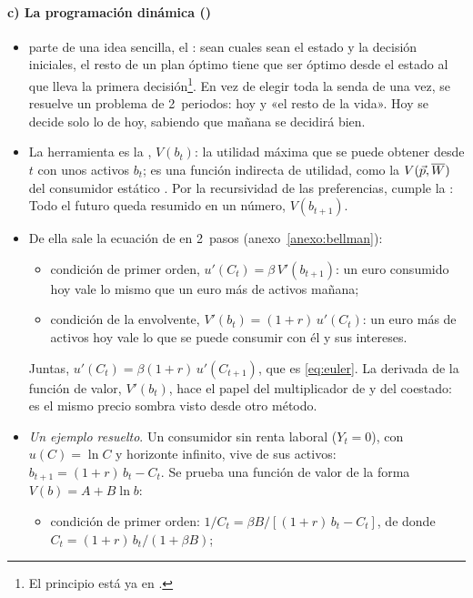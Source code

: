 \documentclass[11pt]{article}
\begin{document}
\paragraph{c) La programación dinámica ()}

\begin{itemize}
\item \textcite{Bellman1957Dynamic} parte de una idea sencilla, el : sean cuales sean el estado y la decisión iniciales, el resto de un plan óptimo tiene que ser óptimo desde el estado al que lleva la primera decisión\footnote{El principio está ya en \textcite{Bellman1952Theory}.}. En vez de elegir toda la senda de una vez, se resuelve un problema de 2~periodos: hoy y «el resto de la vida». Hoy se decide solo lo de hoy, sabiendo que mañana se decidirá bien.
\item La herramienta es la , $V(b_t)$: la utilidad máxima que se puede obtener desde $t$ con unos activos $b_t$; es una función indirecta de utilidad, como la $V(\vec{p},\overline W)$ del consumidor estático . Por la recursividad de las preferencias, cumple la :
  Todo el futuro queda resumido en un número, $V(b_{t+1})$.
\item De ella sale la ecuación de  en 2~pasos (anexo~\ref{anexo:bellman}):
  \begin{itemize}
  \item condición de primer orden, $u'(C_t)=\beta\,V'(b_{t+1})$: un euro consumido hoy vale lo mismo que un euro más de activos mañana;
  \item condición de la envolvente, $V'(b_t)=(1+r)\,u'(C_t)$: un euro más de activos hoy vale lo que se puede consumir con él y sus intereses.
  \end{itemize}
  Juntas, $u'(C_t)=\beta(1+r)\,u'(C_{t+1})$, que es \eqref{eq:euler}. La derivada de la función de valor, $V'(b_t)$, hace el papel del multiplicador de  y del coestado: es el mismo precio sombra visto desde otro método.
\item \emph{Un ejemplo resuelto}. Un consumidor sin renta laboral ($Y_t=0$), con $u(C)=\ln C$ y horizonte infinito, vive de sus activos: $b_{t+1}=(1+r)\,b_t-C_t$. Se prueba una función de valor de la forma $V(b)=A+B\ln b$:
  \begin{itemize}
  \item condición de primer orden: $1/C_t=\beta B/[(1+r)\,b_t-C_t]$, de donde $C_t=(1+r)\,b_t/(1+\beta B)$;

\end{itemize}
\end{itemize}
\end{document}
